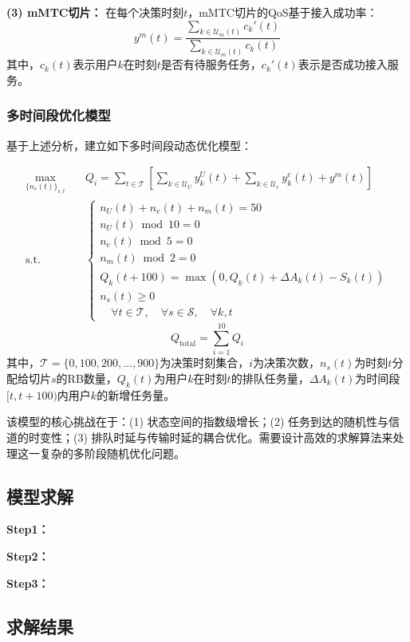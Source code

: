 \textbf{(3) mMTC切片：}
在每个决策时刻$t$，mMTC切片的QoS基于接入成功率：
\begin{equation}
y^{m}(t) = \frac{\sum_{k \in \mathcal{U}_{m}(t)} c_k'(t)}{\sum_{k \in \mathcal{U}_{m}(t)} c_k(t)}
\end{equation}
其中，$c_k(t)$表示用户$k$在时刻$t$是否有待服务任务，$c_k'(t)$表示是否成功接入服务。

\subsubsection{多时间段优化模型}

基于上述分析，建立如下多时间段动态优化模型：

\begin{equation}
\begin{aligned}
\max_{\{n_s(t)\}_{s,t}} \quad & Q_{i} = \sum_{t \in \mathcal{T}} \left[ \sum_{k \in \mathcal{U}_U} y_{k}^{U}(t) + \sum_{k \in \mathcal{U}_e} y_{k}^{e}(t) + y^{m}(t) \right]\\
\text{s.t.} \quad & \begin{cases}
 n_U(t) + n_e(t) + n_m(t) = 50 \\
 n_U(t) \bmod 10 = 0 \\
 n_e(t) \bmod 5 = 0  \\
 n_m(t) \bmod 2 = 0 \\
 Q_k(t+100) = \max(0, Q_k(t) + \Delta A_k(t) - S_k(t))\\
n_s(t) \geq 0 \\
\quad \forall t \in \mathcal{T},\quad \forall s \in \mathcal{S},\quad \forall k, t
 \end{cases}
 \end{aligned}
 \end{equation}
\begin{equation}
Q_{\text{total}} = \sum_{i=1}^{10} Q_{i}
\end{equation}
其中，$\mathcal{T} = \{0, 100, 200, \ldots, 900\}$为决策时刻集合，$i$为决策次数，$n_s(t)$为时刻$t$分配给切片$s$的RB数量，$Q_k(t)$为用户$k$在时刻$t$的排队任务量，$\Delta A_k(t)$为时间段$[t, t+100)$内用户$k$的新增任务量。

该模型的核心挑战在于：(1) 状态空间的指数级增长；(2) 任务到达的随机性与信道的时变性；(3) 排队时延与传输时延的耦合优化。需要设计高效的求解算法来处理这一复杂的多阶段随机优化问题。

\subsection{模型求解}

\textbf{Step1：} 

\textbf{Step2：} 

\textbf{Step3：} 

\subsection{求解结果}